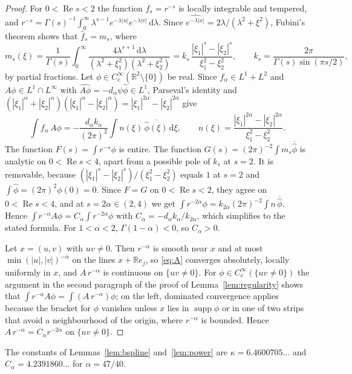 \documentclass[11pt]{amsart}
\theoremstyle{definition}
\theoremstyle{remark}
\numberwithin{equation}{section}
\newcommand{\R}{\mathbb{R}}
\newcommand{\dd}{\,\mathrm{d}}
\newcommand{\supp}{\operatorname{supp}}
\newcommand{\Cc}{C_c^\infty}
\newcommand{\ALPHA}{47/40}
\newcommand{\Calpha}{4.2391860\ldots}
\newcommand{\Kappa}{6.4600705\ldots}
\begin{document}
\begin{proof}
For $0<\operatorname{Re}s<2$ the function $f_s=r^{-s}$ is locally integrable and tempered, and $r^{-s}=\Gamma(s)^{-1}\int_0^\infty\lambda^{s-1}e^{-\lambda|u|}e^{-\lambda|v|}\dd\lambda$. Since $\widehat{e^{-\lambda|x|}}=2\lambda/(\lambda^2+\xi^2)$, Fubini's theorem shows that $\hat f_s=m_s$, where
\[
m_s(\xi)=\frac{1}{\Gamma(s)}\int_0^\infty\frac{4\lambda^{s+1}\dd\lambda}{(\lambda^2+\xi_1^2)(\lambda^2+\xi_2^2)}=k_s\,\frac{|\xi_1|^s-|\xi_2|^s}{\xi_1^2-\xi_2^2},\qquad k_s=\frac{2\pi}{\Gamma(s)\sin(\pi s/2)},
\]
by partial fractions. Let $\phi\in\Cc(\R^2\setminus\{0\})$ be real. Since $f_\alpha\in L^1+L^2$ and $A\phi\in L^1\cap L^\infty$ with $\widehat{A\phi}=-d_\alpha\psi\hat\phi\in L^1$, Parseval's identity and $(|\xi_1|^\alpha+|\xi_2|^\alpha)(|\xi_1|^\alpha-|\xi_2|^\alpha)=|\xi_1|^{2\alpha}-|\xi_2|^{2\alpha}$ give
\[
\int f_\alpha\,A\phi=-\frac{d_\alpha k_\alpha}{(2\pi)^2}\int n(\xi)\,\overline{\hat\phi(\xi)}\dd\xi,\qquad n(\xi)=\frac{|\xi_1|^{2\alpha}-|\xi_2|^{2\alpha}}{\xi_1^2-\xi_2^2}.
\]
The function $F(s)=\int r^{-s}\phi$ is entire. The function $G(s)=(2\pi)^{-2}\int m_s\overline{\hat\phi}$ is analytic on $0<\operatorname{Re}s<4$, apart from a possible pole of $k_s$ at $s=2$. It is removable, because $(|\xi_1|^s-|\xi_2|^s)/(\xi_1^2-\xi_2^2)$ equals $1$ at $s=2$ and $\int\hat\phi=(2\pi)^2\phi(0)=0$. Since $F=G$ on $0<\operatorname{Re}s<2$, they agree on $0<\operatorname{Re}s<4$, and at $s=2\alpha\in(2,4)$ we get $\int r^{-2\alpha}\phi=k_{2\alpha}(2\pi)^{-2}\int n\,\overline{\hat\phi}$. Hence $\int r^{-\alpha}A\phi=C_\alpha\int r^{-2\alpha}\phi$ with $C_\alpha=-d_\alpha k_\alpha/k_{2\alpha}$, which simplifies to the stated formula. For $1<\alpha<2$, $\Gamma(1-\alpha)<0$, so $C_\alpha>0$.

Let $x=(u,v)$ with $uv\ne0$. Then $r^{-\alpha}$ is smooth near $x$ and at most $\min(|u|,|v|)^{-\alpha}$ on the lines $x+\R e_j$, so \eqref{eq:A} converges absolutely, locally uniformly in $x$, and $A\,r^{-\alpha}$ is continuous on $\{uv\ne0\}$. For $\phi\in\Cc(\{uv\ne0\})$ the argument in the second paragraph of the proof of Lemma~\ref{lem:regularity} shows that $\int r^{-\alpha}A\phi=\int(A\,r^{-\alpha})\phi$; on the left, dominated convergence applies because the bracket for $\phi$ vanishes unless $x$ lies in $\supp\phi$ or in one of two strips that avoid a neighbourhood of the origin, where $r^{-\alpha}$ is bounded. Hence $A\,r^{-\alpha}=C_\alpha r^{-2\alpha}$ on $\{uv\ne0\}$.
\end{proof}

The constants of Lemmas~\ref{lem:bspline} and~\ref{lem:power} are $\kappa=\Kappa$ and $C_\alpha=\Calpha$ for $\alpha=\ALPHA$.
\end{document}
